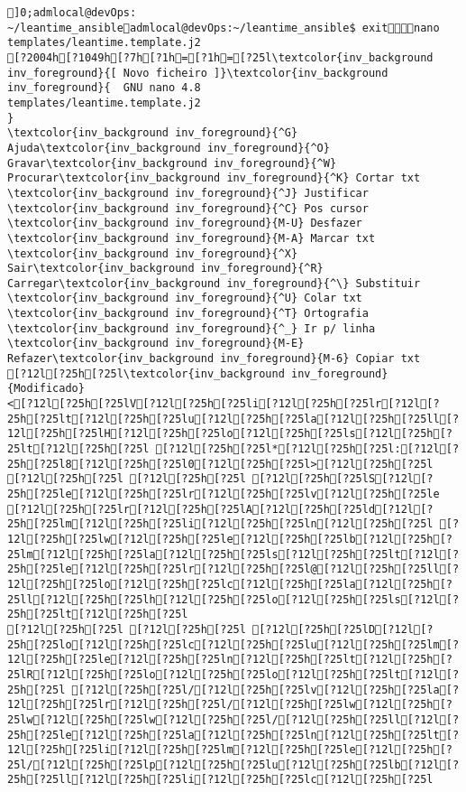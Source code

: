 \documentclass{scrartcl}
\title{}
\begin{document}
\begin{Verbatim}
]0;admlocal@devOps: ~/leantime_ansibleadmlocal@devOps:~/leantime_ansible$ exitnano templates/leantime.template.j2
[?2004h[?1049h[?7h[?1h=[?1h=[?25l\textcolor{inv_background inv_foreground}{[ Novo ficheiro ]}\textcolor{inv_background inv_foreground}{  GNU nano 4.8                                         templates/leantime.template.j2                                                     }
\textcolor{inv_background inv_foreground}{^G} Ajuda\textcolor{inv_background inv_foreground}{^O} Gravar\textcolor{inv_background inv_foreground}{^W} Procurar\textcolor{inv_background inv_foreground}{^K} Cortar txt    \textcolor{inv_background inv_foreground}{^J} Justificar    \textcolor{inv_background inv_foreground}{^C} Pos cursor    \textcolor{inv_background inv_foreground}{M-U} Desfazer     \textcolor{inv_background inv_foreground}{M-A} Marcar txt
\textcolor{inv_background inv_foreground}{^X} Sair\textcolor{inv_background inv_foreground}{^R} Carregar\textcolor{inv_background inv_foreground}{^\} Substituir    \textcolor{inv_background inv_foreground}{^U} Colar txt     \textcolor{inv_background inv_foreground}{^T} Ortografia    \textcolor{inv_background inv_foreground}{^_} Ir p/ linha   \textcolor{inv_background inv_foreground}{M-E} Refazer\textcolor{inv_background inv_foreground}{M-6} Copiar txt
[?12l[?25h[?25l\textcolor{inv_background inv_foreground}{Modificado}
<[?12l[?25h[?25lV[?12l[?25h[?25li[?12l[?25h[?25lr[?12l[?25h[?25lt[?12l[?25h[?25lu[?12l[?25h[?25la[?12l[?25h[?25ll[?12l[?25h[?25lH[?12l[?25h[?25lo[?12l[?25h[?25ls[?12l[?25h[?25lt[?12l[?25h[?25l [?12l[?25h[?25l*[?12l[?25h[?25l:[?12l[?25h[?25l8[?12l[?25h[?25l0[?12l[?25h[?25l>[?12l[?25h[?25l
[?12l[?25h[?25l [?12l[?25h[?25l [?12l[?25h[?25lS[?12l[?25h[?25le[?12l[?25h[?25lr[?12l[?25h[?25lv[?12l[?25h[?25le
[?12l[?25h[?25lr[?12l[?25h[?25lA[?12l[?25h[?25ld[?12l[?25h[?25lm[?12l[?25h[?25li[?12l[?25h[?25ln[?12l[?25h[?25l [?12l[?25h[?25lw[?12l[?25h[?25le[?12l[?25h[?25lb[?12l[?25h[?25lm[?12l[?25h[?25la[?12l[?25h[?25ls[?12l[?25h[?25lt[?12l[?25h[?25le[?12l[?25h[?25lr[?12l[?25h[?25l@[?12l[?25h[?25ll[?12l[?25h[?25lo[?12l[?25h[?25lc[?12l[?25h[?25la[?12l[?25h[?25ll[?12l[?25h[?25lh[?12l[?25h[?25lo[?12l[?25h[?25ls[?12l[?25h[?25lt[?12l[?25h[?25l
[?12l[?25h[?25l [?12l[?25h[?25l [?12l[?25h[?25lD[?12l[?25h[?25lo[?12l[?25h[?25lc[?12l[?25h[?25lu[?12l[?25h[?25lm[?12l[?25h[?25le[?12l[?25h[?25ln[?12l[?25h[?25lt[?12l[?25h[?25lR[?12l[?25h[?25lo[?12l[?25h[?25lo[?12l[?25h[?25lt[?12l[?25h[?25l [?12l[?25h[?25l/[?12l[?25h[?25lv[?12l[?25h[?25la[?12l[?25h[?25lr[?12l[?25h[?25l/[?12l[?25h[?25lw[?12l[?25h[?25lw[?12l[?25h[?25lw[?12l[?25h[?25l/[?12l[?25h[?25ll[?12l[?25h[?25le[?12l[?25h[?25la[?12l[?25h[?25ln[?12l[?25h[?25lt[?12l[?25h[?25li[?12l[?25h[?25lm[?12l[?25h[?25le[?12l[?25h[?25l/[?12l[?25h[?25lp[?12l[?25h[?25lu[?12l[?25h[?25lb[?12l[?25h[?25ll[?12l[?25h[?25li[?12l[?25h[?25lc[?12l[?25h[?25l

\end{Verbatim}
\end{document}
